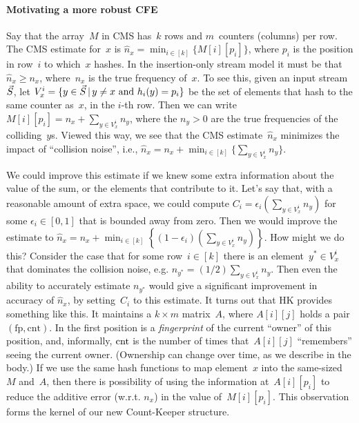 \paragraph{Motivating a more robust CFE} Say that the array~$M$ in CMS has~$k$ rows and $m$~counters (columns) per row.
The CMS estimate for~$x$ is $\hat{n}_x=\min_{i \in [k]} \{M[i][p_i]\}$, where $p_i$ is the position in row~$i$ to which~$x$ hashes.  In the insertion-only stream model it must be that $\hat{n}_x \geq n_x$, where~$n_x$ is the true frequency of~$x$. To see this, given an input stream~$\vec{S}$,
let $V^{i}_{x}=\{y \in \vec{S} \,|\, y\neq x \mbox{ and } h_i(y)=p_i\}$ be the set of elements that hash to the same counter as~$x$, in the $i$-th row.  Then we can write $M[i][p_i]=n_x + \sum_{y \in V^i_x }n_y$, where the $n_y > 0$ are the true frequencies of the colliding~$y$s.
Viewed this way, we see that the CMS estimate~$\hat{n}_x$ minimizes the impact of ``collision noise'', i.e., 
$\hat{n}_x = n_x + \min_{i \in [k]}\{\sum_{y \in V^i_x }n_y\}$.  

We could improve this estimate if we knew some extra information about the value of the sum, or the elements that contribute to it. 
Let's say that, with a reasonable amount of extra space, we could compute $C_i = \epsilon_i \left(\sum_{y \in V^i_x }n_y\right)$ for some $\epsilon_i \in [0,1]$ that is bounded away from zero. Then we would improve the estimate to
$
\hat{n}_x = n_x + \min_{i \in [k]}\left\{(1-\epsilon_i)\left(\sum_{y \in V^i_x }n_y\right)\right\}
$.
How might we do this? Consider the case that for some row~$i \in [k]$ there is an element~$y^* \in V^{i}_{x}$ that dominates the collision noise, e.g. $n_{y^*} = (1/2)\sum_{y \in V^i_x }n_y$.  Then even the ability to accurately estimate $n_{y^*}$ would give a significant improvement in accuracy of $\hat{n}_x$, by setting~$C_i$ to this estimate. It turns out that HK provides something like this. It maintains a $k \times m$ matrix~$A$, where $A[i][j]$ holds a pair $(\mathrm{fp},\mathrm{cnt})$. In the first position is a \emph{fingerprint} of the current ``owner'' of this position, and, informally, $\textup{cnt}$ is the number of times that~$A[i][j]$ ``remembers'' seeing the current owner.  (Ownership can change over time, as we describe in the body.) If we use the same hash functions to map element~$x$ into the same-sized~$M$ and~$A$, then there is possibility of using the information at~$A[i][p_i]$ to reduce the additive error (w.r.t. $n_x$) in the value of~$M[i][p_i]$.  This observation forms the kernel of our new Count-Keeper structure.

